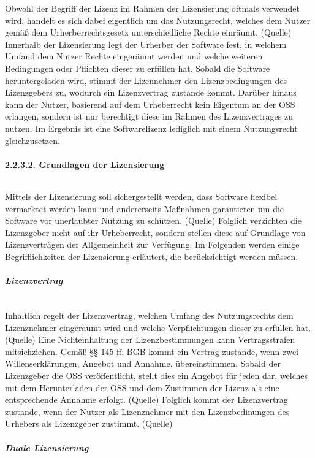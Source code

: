 Obwohl der Begriff der Lizenz im Rahmen der Lizensierung oftmals verwendet wird, handelt es sich dabei eigentlich um das Nutzungsrecht, welches dem Nutzer gemäß dem Urherberrechtsgesetz unterschiedliche Rechte einräumt. (Quelle) Innerhalb der Lizensierung legt der Urherber der Software fest, in welchem Umfand dem Nutzer Rechte eingeräumt werden und welche weiteren Bedingungen oder Pflichten dieser zu erfüllen hat. Sobald die Software heruntergeladen wird, stimmt der Lizennehmer den Lizenzbedingungen des Lizenzgebers zu, wodurch ein Lizenzvertrag zustande kommt. \cite{wilmer_rechtliche_2021} Darüber hinaus kann der Nutzer, basierend auf dem Urheberrecht kein Eigentum an der OSS erlangen, sondern ist nur berechtigt diese im Rahmen des Lizenzvertrages zu nutzen. Im Ergebnis ist eine Softwarelizenz lediglich mit einem Nutzungsrecht gleichzusetzen.\cite[S. 29]{kees_open_2015}

\paragraph{2.2.3.2. Grundlagen der Lizensierung}$~$

Mittels der Lizensierung soll sichergestellt werden, dass Software flexibel vermarktet werden kann und andererseits Maßnahmen garantieren um die Software vor unerlaubter Nutzung zu schützen. (Quelle) Folglich verzichten die Lizenzgeber nicht auf ihr Urheberrecht, sondern stellen diese auf Grundlage von Lizenzverträgen der Allgemeinheit zur Verfügung. Im Folgenden werden einige Begrifflichkeiten der Lizensierung erläutert, die berücksichtigt werden müssen.  

\subparagraph{Lizenzvertrag} $~$

Inhaltlich regelt der Lizenzvertrag, welchen Umfang des Nutzungsrechts dem Lizenznehmer eingeräumt wird und welche Verpflichtungen dieser zu erfüllen hat. (Quelle) Eine Nichteinhaltung der Lizenzbestimmungen kann Vertragsstrafen mitsichziehen. Gemäß §§ 145 ff. BGB kommt ein Vertrag zustande, wenn zwei Willenserklärungen, Angebot und Annahme, übereinstimmen. Sobald der Lizenzgeber die OSS veröffentlicht, stellt dies ein Angebot für jeden dar, welches mit dem Herunterladen der OSS und dem Zustimmen der Lizenz als eine entsprechende Annahme erfolgt. (Quelle) Folglich kommt der Lizenzvertrag zustande, wenn der Nutzer als Lizenznehmer mit den Lizenzbedinungen des Urhebers als Lizenzgeber zustimmt. (Quelle)

\subparagraph{Duale Lizensierung} $~$

